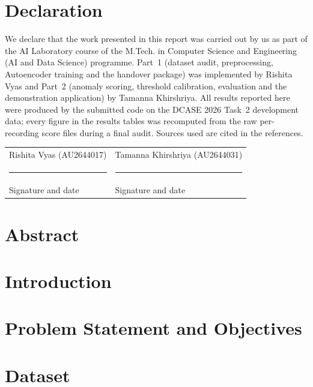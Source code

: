 \documentclass[12pt,a4paper,oneside]{report}
\newcommand{\programmeName}{M.Tech. in Computer Science and Engineering (AI and Data Science)}
\newcommand{\courseName}{AI Laboratory}
\newcommand{\studentOne}{Rishita Vyas}
\newcommand{\studentOneId}{AU2644017}
\newcommand{\studentTwo}{Tamanna Khirshriya}
\newcommand{\studentTwoId}{AU2644031}
\begin{document}
\chapter*{Declaration}
We declare that the work presented in this report was carried out by us as part of the \courseName{} course of the \programmeName{} programme. Part~1 (dataset audit, preprocessing, Autoencoder training and the handover package) was implemented by \studentOne{} and Part~2 (anomaly scoring, threshold calibration, evaluation and the demonstration application) by \studentTwo. All results reported here were produced by the submitted code on the DCASE 2026 Task~2 development data; every figure in the results tables was recomputed from the raw per-recording score files during a final audit. Sources used are cited in the references.

\vspace{1.5cm}
\noindent\begin{tabular}{@{}p{}p{}@{}}
\studentOne{} (\studentOneId) & \studentTwo{} (\studentTwoId)\\[1.2cm]
\rule{5cm}{0.4pt} & \rule{5cm}{0.4pt}\\
Signature and date & Signature and date
\end{tabular}

\chapter*{Abstract}


\tableofcontents
\listoffigures
\listoftables
\cleardoublepage
{}

\chapter{Introduction}\label{ch:intro}

\chapter{Problem Statement and Objectives}\label{ch:problem}

\chapter{Dataset}\label{ch:dataset}

\end{document}
